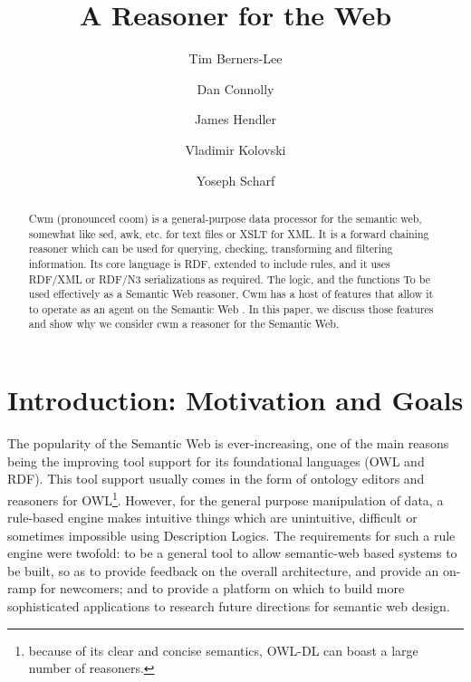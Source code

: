 \documentclass{tlp}
\begin{document}
   


\title{A Reasoner for the Web}
\author[Berners-Lee et. al.]{Tim Berners-Lee \and Dan Connolly \and James Hendler \and Vladimir Kolovski \and Yoseph Scharf}
  \maketitle
\label{firstpage}
  

    \begin{abstract}
  


\par Cwm (pronounced coom) is a general-purpose data processor for
the semantic web, somewhat like sed, awk, etc. for text files or
XSLT for XML. It is a forward chaining reasoner which can be used
for querying, checking, transforming and filtering information. Its
core language is RDF, extended to include rules, and it uses
RDF/XML or RDF/N3 serializations as required. The logic, and the
functions To be used effectively as a Semantic Web reasoner, Cwm
has a host of features that allow it to operate as an agent on the
Semantic Web . In this paper, we discuss those features and show
why we consider cwm a reasoner for the Semantic Web.
\end{abstract}
  


\section{Introduction: Motivation and Goals}
  

\par The popularity of the Semantic Web is ever-increasing, one of
the main reasons being the improving tool support for its
foundational languages (OWL and RDF). This tool support usually
comes in the form of ontology editors and reasoners for
OWL\footnote{because of its clear and concise semantics,
 OWL-DL can boast a large number of reasoners.}.
However, for the general
purpose manipulation of data, a rule-based engine makes intuitive
things which are unintuitive, difficult or sometimes impossible
using Description Logics. The requirements for such a rule engine
were twofold: to be a general tool to allow semantic-web based
systems to be built, so as to provide feedback on the overall
architecture, and provide an on-ramp for newcomers; and to provide
a platform on which to build more sophisticated applications to
research future directions for semantic web design.
\end{document}
